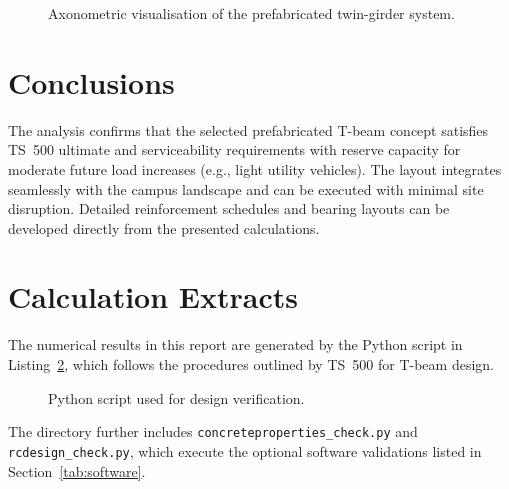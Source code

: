 \documentclass[12pt,a4paper]{article}
\begin{document}
\begin{figure}[h]
\centering
{}
\caption{Axonometric visualisation of the prefabricated twin-girder system.}
\label{fig:3d}
\end{figure}

\section{Conclusions}
The analysis confirms that the selected prefabricated T-beam concept satisfies TS~500 ultimate and serviceability requirements with reserve capacity for moderate future load increases (e.g., light utility vehicles). The layout integrates seamlessly with the campus landscape and can be executed with minimal site disruption. Detailed reinforcement schedules and bearing layouts can be developed directly from the presented calculations.

\appendix
\section{Calculation Extracts}\label{app:python}
The numerical results in this report are generated by the Python script in Listing~\ref{lst:python}, which follows the procedures outlined by TS~500 for T-beam design.

\begin{figure}[h]
\centering
\begin{minipage}{0.95\linewidth}
\scriptsize

\end{minipage}
\caption{Python script used for design verification.}
\label{lst:python}
\end{figure}

The directory further includes \texttt{concreteproperties\_check.py} and \texttt{rcdesign\_check.py}, which execute the optional software validations listed in Section~\ref{tab:software}.
\end{document}
